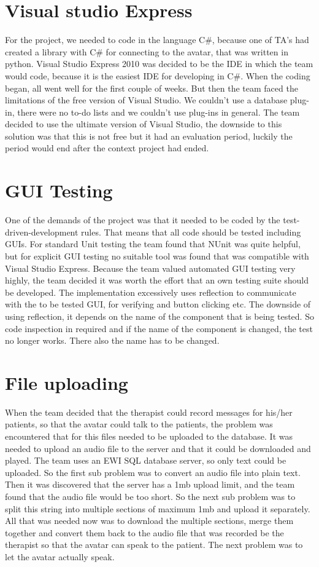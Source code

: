 \section{Visual studio Express}
For the project, we needed to code in the language C\#, because one of TA's had created a library with C\# for connecting to the avatar, that was written in python. Visual Studio Express 2010 was decided to be the IDE in which the team would code, because it is the easiest IDE for developing in C\#. When the coding began, all went well for the first couple of weeks. But then the team faced the limitations of the free version of Visual Studio. We couldn't use a database plug-in, there were no to-do lists and we couldn't use plug-ins in general. The team decided to use the ultimate version of Visual Studio, the downside to this solution was that this is not free but it had an evaluation period, luckily the period would end after the context project had ended.
\section{GUI Testing}
One of the demands of the project was that it needed to be coded by the test-driven-development rules. That means that all code should be tested including GUIs. For standard Unit testing the team found that NUnit was quite helpful, but for explicit GUI testing no suitable tool was found that was compatible with Visual Studio Express. Because the team valued automated GUI testing very highly, the team decided it was worth the effort that an own testing suite should be developed. The implementation excessively uses reflection to communicate with the to be tested GUI, for verifying and button clicking etc. The downside of using reflection, it depends on the name of the component that is being tested. So code inspection in required and if the name of the component is changed, the test no longer works. There also the name has to be changed.
\section{File uploading}
When the team decided that the therapist could record messages for his/her patients, so that the avatar could talk to the patients, the problem was encountered that for this files needed to be uploaded to the database. It was needed to upload an audio file to the server and that it could be downloaded and played. The team uses an EWI SQL database server, so only text could be uploaded. So the first sub problem was to convert an audio file into plain text. Then it was discovered that the server has a 1mb upload limit, and the team found that the audio file would be too short. So the next sub problem was to split this string into multiple sections of maximum 1mb and upload it separately. All that was needed now was to download the multiple sections, merge them together and convert them back to the audio file that was recorded be the therapist so that the avatar can speak to the patient. The next problem was to let the avatar actually speak.
